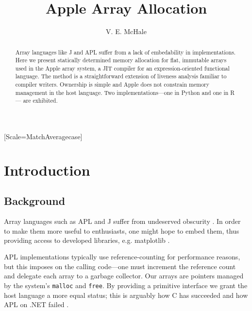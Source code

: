 \documentclass[sigplan,screen,anonymous]{acmart}
\begin{document}
\setmonofont{Jet Brains Mono}[Scale=MatchAveragecase]


\begin{abstract}
    Array languages like J and APL suffer from a lack of embedability in implementations.
    Here we present statically determined memory allocation for flat, immutable arrays used in the Apple array system, a JIT compiler for an expression-oriented functional language.
    The method is a straightforward extension of liveness analysis familiar to compiler writers.
    Ownership is simple and Apple does not constrain memory management in the host language.
    Two implementations---one in Python and one in R--- are exhibited.
\end{abstract}

\title{Apple Array Allocation}
\author{V. E. McHale}
\maketitle

\section{Introduction}

\subsection{Background}

Array languages such as APL and J suffer from undeserved obscurity \cite{hsu2023}. In order to make them more useful to enthusiasts, one might hope to embed them, thus providing access to developed libraries, e.g. matplotlib \cite{hunter2007}.


APL implementations typically use reference-counting \cite[p.~47]{hui2020} for performance reasons, but this imposes on the calling code---one must increment the reference count and delegate each array to a garbage collector. Our arrays are pointers managed by the system's {\tt malloc} and {\tt free}. By providing a primitive interface we grant the host language a more equal status; this is arguably how C has succeeded \cite{kell2017} and how APL on .NET failed \cite[p.~12]{hui2020}.
\end{document}

